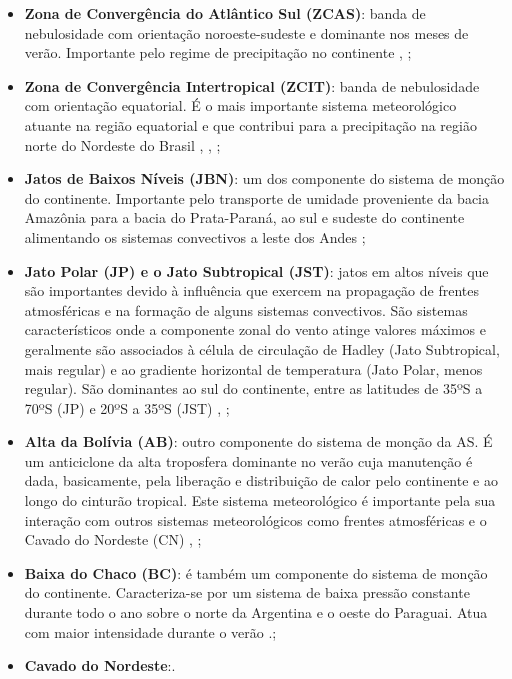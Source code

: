 \begin{itemize}
\item \textbf{Zona de Convergência do Atlântico Sul (ZCAS)}: banda de nebulosidade com orientação noroeste-sudeste e dominante nos meses de verão. Importante pelo regime de precipitação no continente \cite{kodama92a}, \cite{kodama92b};
\item \textbf{Zona de Convergência Intertropical (ZCIT)}: banda de nebulosidade com orientação equatorial. É o mais importante sistema meteorológico a\-tu\-an\-te na região equatorial e que contribui para a precipitação na região norte do Nordeste do Brasil \cite{hastenrathheller77}, \cite{uvonobre89a}, \cite{uvonobre89b};
\item \textbf{Jatos de Baixos Níveis (JBN)}: um dos componente do sistema de monção do continente. Importante pelo transporte de umidade proveniente da bacia Amazônia para a bacia do Prata-Paraná, ao sul e sudeste do continente alimentando os sistemas convectivos a leste dos Andes \cite{bonner68};
\item \textbf{Jato Polar (JP) e o Jato Subtropical (JST)}: jatos em altos níveis que são importantes devido à influência que exercem na propagação de frentes atmosféricas e na formação de alguns sistemas convectivos. São sistemas característicos onde a componente zonal do vento atinge valores máximos e geralmente são associados à célula de circulação de Hadley (Jato Subtropical, mais regular) e ao gradiente horizontal de temperatura (Jato Polar, menos regular). São dominantes ao sul do continente, entre as latitudes de 35ºS a 70ºS (JP) e  20ºS a 35ºS (JST) \cite{reiter69}, \cite{riehl69};
\item \textbf{Alta da Bolívia (AB)}: outro componente do sistema de monção da AS. É um anticiclone da alta troposfera dominante no verão cuja manutenção é dada, basicamente, pela liberação e distribuição de calor pelo continente e ao longo do cinturão tropical. Este sistema meteorológico é importante pela sua interação com outros sistemas meteorológicos como frentes atmosféricas e o Cavado do Nordeste (CN) \cite{carvalho89}, \cite{oliveira86};
\item \textbf{Baixa do Chaco (BC)}: é também um componente do sistema de monção do continente. Caracteriza-se por um sistema de baixa pressão constante durante todo o ano sobre o norte da Argentina e o oeste do Paraguai. Atua com maior intensidade durante o verão \cite{grimmetal04}.;
\item \textbf{Cavado do Nordeste}:.
\end{itemize}

